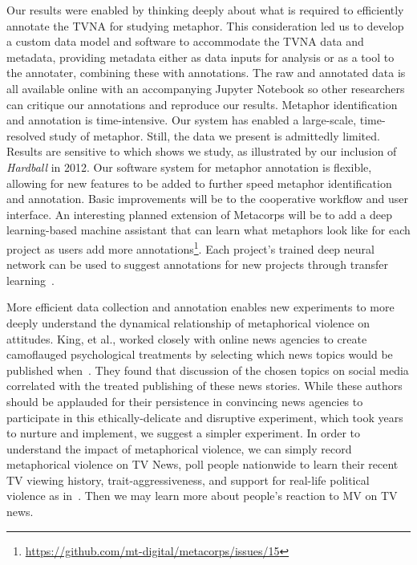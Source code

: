 Our results were enabled by thinking deeply about what is required to efficiently
annotate the TVNA for studying metaphor. This consideration led us to develop
a custom data model and software to accommodate the TVNA data and metadata,
providing metadata either as data inputs for analysis or as a tool to 
the annotater, combining these with annotations. The raw and annotated data
is all available online with an accompanying Jupyter Notebook so other 
researchers can critique our annotations and reproduce our results. 
Metaphor identification and annotation is time-intensive. Our system has
enabled a large-scale, time-resolved study of metaphor.
Still, the data we present is admittedly limited. Results are 
sensitive to which shows we study, as illustrated by 
our inclusion of \emph{Hardball} in 2012. Our software system for metaphor annotation
is flexible, allowing for new features to be added to further speed metaphor
identification and annotation. Basic improvements will be to the cooperative
workflow and user interface. An interesting planned extension of Metacorps
will be to add a deep learning-based machine assistant that can learn what 
metaphors look like for each project as users add more 
annotations\footnote{\url{https://github.com/mt-digital/metacorps/issues/15}}\cite{DoDinh2016,Rei2017}.  
Each project's trained deep neural network can be used to suggest annotations
for new projects through transfer learning~\cite[p. 526]{Goodfellow2016a}.

More efficient data collection and annotation enables new experiments
to more deeply understand the dynamical relationship of metaphorical violence on 
attitudes. King, et al., worked closely with online news agencies to
create camoflauged psychological treatments by selecting which news topics
would be published when~\cite{King2017}. They found that discussion of 
the chosen topics on social media correlated with the treated publishing of these 
news stories. While these authors
should be applauded for their persistence in convincing news agencies
to participate in this ethically-delicate and disruptive 
experiment, which took years to nurture and implement, we suggest a simpler
experiment. In order to understand the impact of metaphorical violence,
we can simply record metaphorical violence on TV News, poll people nationwide
to learn their recent TV viewing history, trait-aggressiveness,
and support for real-life political violence as in~\cite{Kalmoe2014}. Then we 
may learn more about people's reaction to MV on TV news. 

